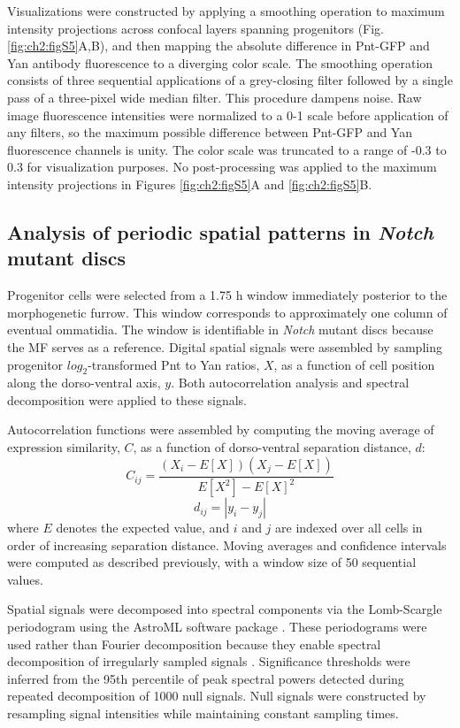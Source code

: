 Visualizations were constructed by applying a smoothing operation to maximum intensity projections across confocal layers spanning progenitors (Fig. \ref{fig:ch2:figS5}A,B), and then mapping the absolute difference in Pnt-GFP and Yan antibody fluorescence to a diverging color scale. The smoothing operation consists of three sequential applications of a grey-closing filter followed by a single pass of a three-pixel wide median filter. This procedure dampens noise. Raw image fluorescence intensities were normalized to a 0-1 scale before application of any filters, so the maximum possible difference between Pnt-GFP and Yan fluorescence channels is unity. The color scale was truncated to a range of -0.3 to 0.3 for visualization purposes. No post-processing was applied to the maximum intensity projections in Figures \ref{fig:ch2:figS5}A and \ref{fig:ch2:figS5}B.

\subsection{Analysis of periodic spatial patterns in \textit{Notch} mutant discs}

Progenitor cells were selected from a 1.75 h window immediately posterior to the morphogenetic furrow. This window corresponds to approximately one column of eventual ommatidia. The window is identifiable in \textit{Notch} mutant discs because the MF serves as a reference. Digital spatial signals were assembled by sampling progenitor $log_2$-transformed Pnt to Yan ratios, $X$, as a function of cell position along the dorso-ventral axis, $y$. Both autocorrelation analysis and spectral decomposition were applied to these signals.

Autocorrelation functions were assembled by computing the moving average of expression similarity, $C$, as a function of dorso-ventral separation distance, $d$:
\begin{equation}
C_{ij} = \frac{ (X_i-E[X])(X_j-E[X]) }{ E[X^2] - E[X]^2 }
\end{equation}
\begin{equation}
d_{ij} = | y_i - y_j |
\end{equation}
where $E$ denotes the expected value, and $i$ and $j$ are indexed over all cells in order of increasing separation distance. Moving averages and confidence intervals were computed as described previously, with a window size of 50 sequential values.

Spatial signals were decomposed into spectral components via the Lomb-Scargle periodogram using the AstroML software package \cite{VanderPlas2012}. These periodograms were used rather than Fourier decomposition because they enable spectral decomposition of irregularly sampled signals \cite{VanderPlas2018}. Significance thresholds were inferred from the 95th percentile of peak spectral powers detected during repeated decomposition of 1000 null signals. Null signals were constructed by resampling signal intensities while maintaining constant sampling times.








